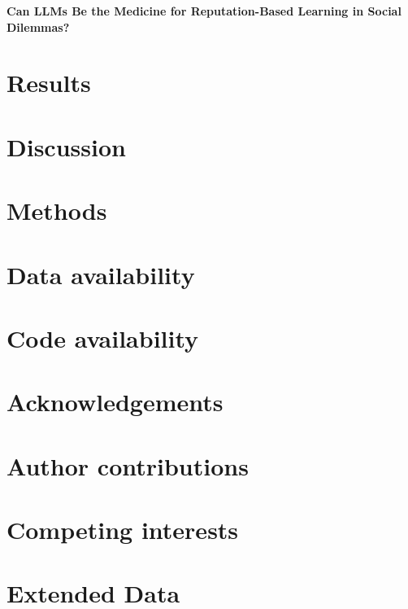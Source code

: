 \documentclass[11pt]{article}
\begin{document}
\onehalfspacing
\linenumbers

\begin{center}
  {\Large\bfseries Can LLMs Be the Medicine for Reputation-Based Learning in Social Dilemmas?\par}
\end{center}

\begin{abstract}
\end{abstract}


\section*{Results}

\section*{Discussion}

\section*{Methods}

\section*{Data availability}

\section*{Code availability}




\section*{Acknowledgements}

\section*{Author contributions}

\section*{Competing interests}

\section*{Extended Data}
\end{document}
